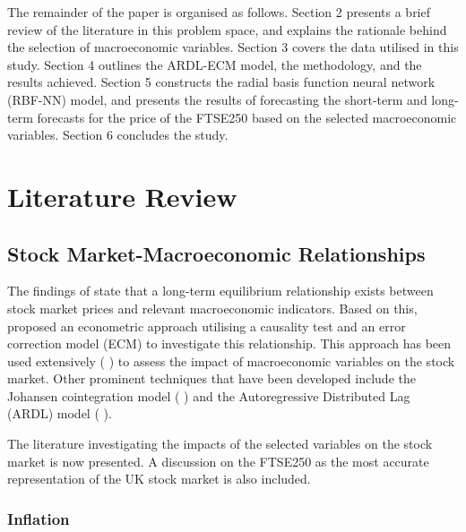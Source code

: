 \documentclass[11pt,a4paper]{article}
\newcommand{\citeboth}[1]{\citeauthor{#1} \citep{#1}}
\begin{document}
The remainder of the paper is organised as follows. Section 2 presents a brief review of the literature in this problem space, and explains the rationale behind the selection of macroeconomic variables. Section 3 covers the data utilised in this study. Section 4 outlines the ARDL-ECM model, the methodology, and the results achieved. Section 5 constructs the radial basis function neural network (RBF-NN) model, and presents the results of forecasting the short-term and long-term forecasts for the price of the FTSE250 based on the selected macroeconomic variables. Section 6 concludes the study.

\section{Literature Review}

\subsection{Stock Market-Macroeconomic Relationships}

The findings of \citeboth{ChenRollRoss1986} state that a long-term equilibrium relationship 
exists between stock market prices and relevant macroeconomic indicators. Based on this, 
\citeboth{EngleGranger1987} proposed an econometric approach utilising a causality test and an 
error correction model (ECM) to investigate this relationship. This approach has been used extensively (\citeboth{QuadriMasih, Plíhal2016,olomu2015}) to assess the impact of macroeconomic variables on the stock market. 
Other prominent techniques that have been developed include the Johansen cointegration model (\citeboth{YadavKheraMishra2021,Ozcan2012,ChistiShakeelGanai2020}) and the Autoregressive Distributed Lag (ARDL) model (\citeboth{khan2018,demir2019,neifar2023}).

The literature investigating the impacts of the selected variables on the stock market is now presented. A discussion on the FTSE250 as the most accurate representation of the UK stock market is also included.

\subsubsection{Inflation}
\end{document}
